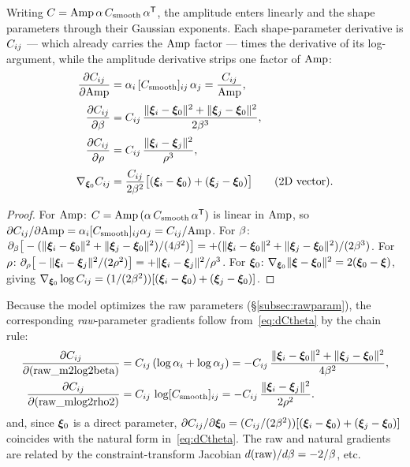 \begin{proposition}
Writing $C=\mathrm{Amp}\,\alpha\,C_{\mathrm{smooth}}\,\alpha^{\mathsf{T}}$, the amplitude enters linearly and
the shape parameters through their Gaussian exponents. Each shape-parameter
derivative is $C_{ij}$ --- which already carries the $\mathrm{Amp}$ factor --- times the
derivative of its log-argument, while the amplitude derivative strips one factor of
$\mathrm{Amp}$:
\begin{equation}
\label{eq:dCtheta}
\begin{aligned}
\frac{\partial C_{ij}}{\partial\mathrm{Amp}}
&=\alpha_i\,[C_{\mathrm{smooth}}]_{ij}\,\alpha_j=\frac{C_{ij}}{\mathrm{Amp}},\\[2pt]
\frac{\partial C_{ij}}{\partial\beta}
&=C_{ij}\,\frac{\lVert\bm{\xi}_i-\bm{\xi}_{0}\rVert^2+\lVert\bm{\xi}_j-\bm{\xi}_{0}\rVert^2}{2\beta^3},\\[2pt]
\frac{\partial C_{ij}}{\partial\rho}
&=C_{ij}\,\frac{\lVert\bm{\xi}_i-\bm{\xi}_j\rVert^2}{\rho^3},\\[2pt]
\nabla_{\bm{\xi}_{0}}C_{ij}
&=\frac{C_{ij}}{2\beta^2}\big[(\bm{\xi}_i-\bm{\xi}_{0})+(\bm{\xi}_j-\bm{\xi}_{0})\big]\qquad(\text{2D vector}).
\end{aligned}
\end{equation}
\end{proposition}

\begin{proof}
For $\mathrm{Amp}$: $C=\mathrm{Amp}\,(\alpha\,C_{\mathrm{smooth}}\,\alpha^{\mathsf{T}})$ is linear in $\mathrm{Amp}$, so
$\partial C_{ij}/\partial\mathrm{Amp}=\alpha_i[C_{\mathrm{smooth}}]_{ij}\alpha_j=C_{ij}/\mathrm{Amp}$. For $\beta$:
$\partial_\beta\big[-(\lVert\bm{\xi}_i-\bm{\xi}_{0}\rVert^2+\lVert\bm{\xi}_j-\bm{\xi}_{0}\rVert^2)/(4\beta^2)\big]
=+(\lVert\bm{\xi}_i-\bm{\xi}_{0}\rVert^2+\lVert\bm{\xi}_j-\bm{\xi}_{0}\rVert^2)/(2\beta^3)$. For $\rho$:
$\partial_\rho\big[-\lVert\bm{\xi}_i-\bm{\xi}_j\rVert^2/(2\rho^2)\big]=+\lVert\bm{\xi}_i-\bm{\xi}_j\rVert^2/\rho^3$.
For $\bm{\xi}_{0}$: $\nabla_{\bm{\xi}_{0}}\lVert\bm{\xi}-\bm{\xi}_{0}\rVert^2=2(\bm{\xi}_{0}-\bm{\xi})$, giving
$\nabla_{\bm{\xi}_{0}}\log C_{ij}=(1/(2\beta^2))[(\bm{\xi}_i-\bm{\xi}_{0})+(\bm{\xi}_j-\bm{\xi}_{0})]$.
\end{proof}

\begin{remark}
Because the model optimizes the raw parameters (\S\ref{subsec:rawparam}), the
corresponding \emph{raw}-parameter gradients follow from~\eqref{eq:dCtheta} by the
chain rule:
\begin{equation}
\begin{aligned}
\frac{\partial C_{ij}}{\partial(\text{raw\_m2log2beta})}
&=C_{ij}\,(\log\alpha_i+\log\alpha_j)
=-C_{ij}\,\frac{\lVert\bm{\xi}_i-\bm{\xi}_{0}\rVert^2+\lVert\bm{\xi}_j-\bm{\xi}_{0}\rVert^2}{4\beta^2},\\
\frac{\partial C_{ij}}{\partial(\text{raw\_mlog2rho2})}
&=C_{ij}\,\log[C_{\mathrm{smooth}}]_{ij}
=-C_{ij}\,\frac{\lVert\bm{\xi}_i-\bm{\xi}_j\rVert^2}{2\rho^2}.
\end{aligned}
\end{equation}
and, since $\bm{\xi}_{0}$ is a direct parameter,
$\partial C_{ij}/\partial\bm{\xi}_{0}=(C_{ij}/(2\beta^2))[(\bm{\xi}_i-\bm{\xi}_{0})+(\bm{\xi}_j-\bm{\xi}_{0})]$
coincides with the natural form in~\eqref{eq:dCtheta}. The raw and natural
gradients are related by the constraint-transform Jacobian
$d(\text{raw})/d\beta=-2/\beta$, etc.
\end{remark}

